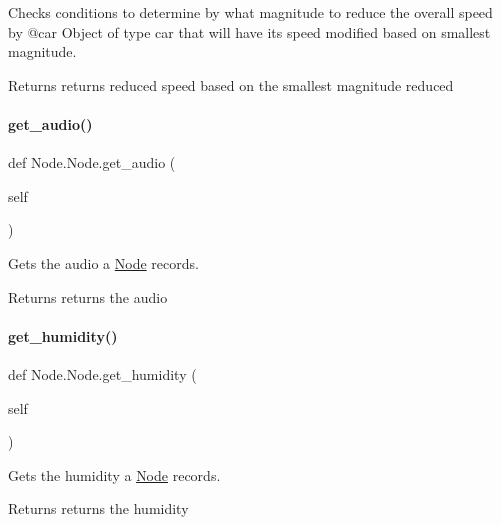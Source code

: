 Checks conditions to determine by what magnitude to reduce the overall speed by @car Object of type car that will have its speed modified based on smallest magnitude. 

\begin{DoxyReturn}{Returns}
returns reduced speed based on the smallest magnitude reduced 
\end{DoxyReturn}
\mbox{\label{class_node_1_1_node_a2e12679376ca18a98f47a6988d310340}} 
\paragraph{\texorpdfstring{get\_audio()}{get\_audio()}}
{\footnotesize\ttfamily def Node.\+Node.\+get\+\_\+audio (\begin{DoxyParamCaption}\item[{}]{self }\end{DoxyParamCaption})}



Gets the audio a \mbox{\hyperlink{class_node_1_1_node}{Node}} records. 

\begin{DoxyReturn}{Returns}
returns the audio 
\end{DoxyReturn}
\mbox{\label{class_node_1_1_node_ac263b1d61ca39497828fa89edfd1ccb5}} 
\paragraph{\texorpdfstring{get\_humidity()}{get\_humidity()}}
{\footnotesize\ttfamily def Node.\+Node.\+get\+\_\+humidity (\begin{DoxyParamCaption}\item[{}]{self }\end{DoxyParamCaption})}



Gets the humidity a \mbox{\hyperlink{class_node_1_1_node}{Node}} records. 

\begin{DoxyReturn}{Returns}
returns the humidity 
\end{DoxyReturn}
\mbox{\label{class_node_1_1_node_a1ef7ba3e5df86018bc19d9a3312b9c37}} 
